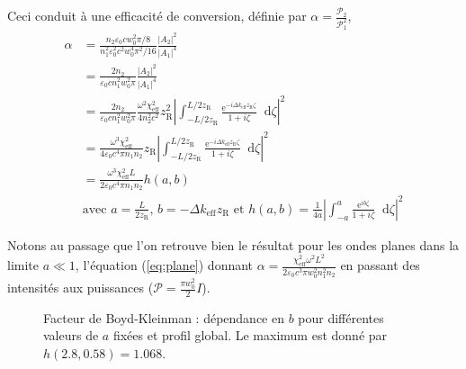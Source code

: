 \documentclass[11pt,a4paper]{article}
\newcommand{\diff}{\mathop{}\!\mathrm{d}}
\newcommand{\zr}{z_\mathsc{R}}
\newcommand{\chie}{\chi_\mathsc{eff}}
\renewcommand{\P}{\mathscr{P}}
\newcommand{\e}[1]{\text{e}^{#1}}
\newcommand{\mathsc}[1]{\mathrm{\scriptscriptstyle {#1}}}
\begin{document}
Ceci conduit à une efficacité de conversion, définie par $\alpha = \frac{\P_2}{\P_1^2}$,
\begin{align} 
\label{eq:BK}
	\alpha &= \frac{n_2 \varepsilon_0 c w_0^2 \pi/8}{n_1^2 \varepsilon_0^2 c^2 w_0^4 \pi^2/16} \frac{|A_2|^2}{|A_1|^4} \nonumber \\
	&= \frac{2n_2}{\varepsilon_0 c n_1^2 w_0^2 \pi} \frac{|A_2|^2}{|A_1|^4} \nonumber  \\
	&= \frac{2n_2}{\varepsilon_0 c n_1^2 w_0^2 \pi} \frac{\omega^2\chi_\mathsc{eff}^2}{4 n_2^2 c^2} \zr^2 
	\left| \int_{-L/2\zr}^{L/2\zr} \frac{\e{-i\Delta k_\mathsc{eff} \zr \zeta}}{1+i\zeta} \diff \zeta \right|^2 \nonumber \\
	&= \frac{\omega^3 \chie^2}{4 \varepsilon_0 c^4 \pi n_1 n_2} \zr 
	\left| \int_{-L/2\zr}^{L/2\zr} \frac{\e{-i\Delta k_\mathsc{eff} \zr \zeta}}{1+i\zeta} \diff \zeta \right|^2 \nonumber \\
	&= \frac{\omega^3 \chie^2 L}{2 \varepsilon_0 c^4 \pi n_1 n_2} h(a,b) \\
	&\text{avec } \boxed{ a=\frac{L}{2z_{\mathsc R}}\text{, } b=- \Delta k_\mathsc{eff} z_{\mathsc R}
	\text{ et } h(a,b)=\frac{1}{4a} \left|\int_{-a}^{a} \frac{\e{ib\zeta}}{1+i\zeta} \diff \zeta \right|^2 } \nonumber 
\end{align}


Notons au passage que l'on retrouve bien le résultat pour les ondes planes dans la limite $a\ll1$, l'équation (\ref{eq:plane}) donnant $\alpha = \frac{\chie^2 \omega^2 L^2}{2 \varepsilon_0 c^3 \pi w_0^2 n_1^2 n_2}$ en passant des intensités aux puissances ($\P = \frac{\pi w_0^2}{2} I$). 


\begin{figure}[htpb] 
\centering
\hspace*{-1cm}
\begin{subfigure}[b]{0.48\textwidth}
	\small
	
\end{subfigure}
\hspace{0.2cm}
\begin{subfigure}[b]{0.48\textwidth}
	\small
	
\end{subfigure}
\vspace{-0.5cm}
\caption{Facteur de Boyd-Kleinman : \small dépendance en $b$ pour différentes valeurs de $a$ fixées et profil global. Le maximum est donné par $h(2.8,0.58)=1.068$.}
\label{fig:bk-factor}
\end{figure}
\end{document}
